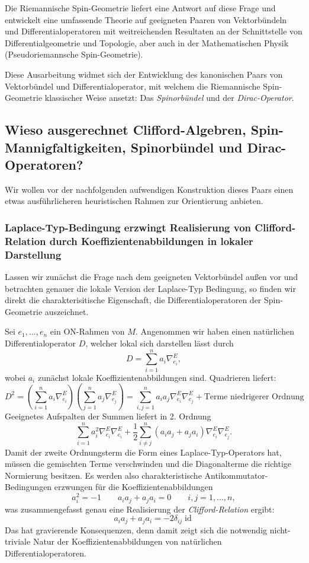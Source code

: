 \documentclass[10pt, letterpaper]{article}
\newcommand{\id}{\operatorname{id}}
\begin{document}
Die Riemannische Spin-Geometrie liefert eine Antwort auf diese Frage und entwickelt eine umfassende Theorie auf geeigneten Paaren von Vektorbündeln und Differentialoperatoren mit weitreichenden Resultaten an der Schnittstelle von Differentialgeometrie und Topologie, aber auch in der Mathematischen Physik (Pseudoriemannsche Spin-Geometrie).


Diese Ausarbeitung widmet sich der Entwicklung des kanonischen Paars von Vektorbündel und Differentialoperator, mit welchem die Riemannische Spin-Geometrie klassischer Weise ansetzt: Das \emph{Spinorbündel} und der \emph{Dirac-Operator}.  

\subsection{Wieso ausgerechnet Clifford-Algebren, Spin-Mannigfaltigkeiten, Spinorbündel und Dirac-Operatoren?}

Wir wollen vor der nachfolgenden aufwendigen Konstruktion dieses Paars einen etwas ausführlicheren heuristischen Rahmen zur Orientierung anbieten.


\subsubsection{Laplace-Typ-Bedingung erzwingt Realisierung von Clifford-Relation durch Koeffizientenabbildungen in lokaler Darstellung}

Lassen wir zunächst die Frage nach dem geeigneten Vektorbündel außen vor und betrachten genauer die lokale Version der Laplace-Typ Bedingung, so finden wir direkt die charakterisitische Eigenschaft, die Differentialoperatoren der Spin-Geometrie auszeichnet.

Sei $e_1,...,e_n$ ein ON-Rahmen von $M$. Angenommen wir haben einen natürlichen Differentialoperator $D$, welcher lokal sich darstellen lässt durch
$$D=\sum_{i=1}^n a_i\nabla_{e_i}^E,$$
wobei $a_i$ zunächst lokale Koeffizientenabbildungen sind. Quadrieren liefert:
$$D^2=\left(\sum_{i=1}^n a_i\nabla_{e_i}^E\right)\left(\sum_{j=1}^n a_j\nabla^E_{e_j}\right)=\sum_{i,j=1}^n a_ia_j\nabla^E_{e_i}\nabla^E_{e_j} + \text{Terme niedrigerer Ordnung}$$
Geeignetes Aufspalten der Summen liefert in 2. Ordnung
$$\sum_{i=1}^n a_i^2\nabla^E_{e_i}\nabla^E_{e_i} + \frac{1}{2}\sum_{i\neq j}^n (a_ia_j+ a_ja_i)\nabla^E_{e_i}\nabla^E_{e_j}.$$
Damit der zweite Ordnungsterm die Form eines Laplace-Typ-Operators hat, müssen die gemischten Terme verschwinden und die Diagonalterme die richtige Normierung besitzen. Es werden also charakteristische Antikommutator-Bedingungen erzwungen für die Koeffizientenabbildungen
$$a_i^2=-1 \qquad a_ia_j+a_ja_i = 0\qquad i,j=1,...,n,$$
was zusammengefasst genau eine Realisierung der \emph{Clifford-Relation} ergibt:
$$a_ia_j+a_ja_i=-2\delta_{ij}\id$$
Das hat gravierende Konsequenzen, denn damit zeigt sich die notwendig nicht-triviale Natur der Koeffizientenabbildungen von natürlichen Differentialoperatoren.  
\end{document}
